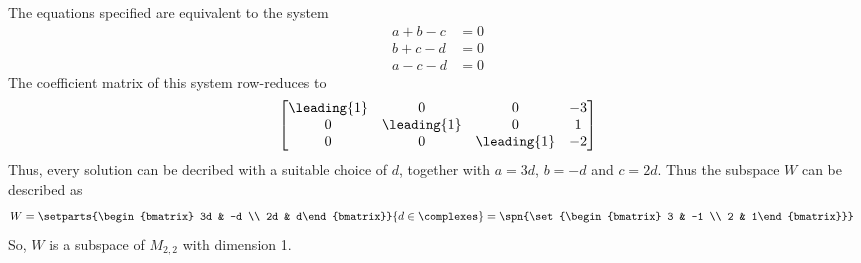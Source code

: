 The equations specified are equivalent to the system
\begin{align*}
a + b - c &= 0\\
b + c - d &= 0\\
a - c - d &= 0
\end{align*}
%
The coefficient matrix of this system row-reduces to 
%
\begin{align*}
\begin{bmatrix}  
\leading{1} & 0 &  0& -3\\ 
0 & \leading{1} & 0 & 1\\ 
0 & 0 & \leading{1} & -2
\end{bmatrix}
\end{align*}
%
Thus, every solution can be decribed with a suitable choice of $d$, together with $a = 3d$, $b = -d$ and $c = 2d$.  Thus
the subspace $W$ can be described as 
%
\begin{align*}
W &= \setparts{\begin{bmatrix} 3d & -d \\ 2d & d\end{bmatrix}}{d\in\complexes}
=\spn{\set{\begin{bmatrix} 3 & -1 \\ 2 & 1\end{bmatrix}}}
\end{align*}
%
So, $W$ is a subspace of $M_{2,2}$ with dimension 1.
